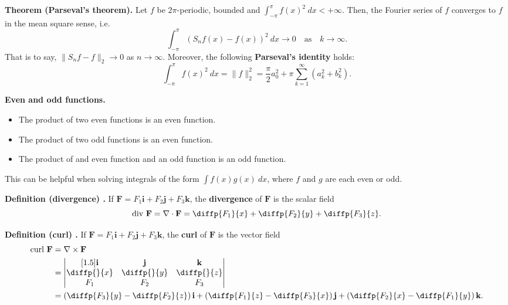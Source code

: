 \begin{shaded}
\textbf{Theorem (Parseval's theorem).} Let $f$ be $2 \pi$-periodic, bounded and $\int_{-\pi}^\pi f(x)^2 \ dx < + \infty$. Then, the Fourier series of $f$ converges to $f$ in the mean square sense, i.e.
$$ \int_{- \pi}^\pi (S_n f(x) - f(x))^2 \ dx \to 0 \quad \text{as} \quad k \to \infty . $$
That is to say, $\lVert S_n f - f \rVert_2 \to 0$ as $n \to \infty$. Moreover, the following \textbf{Parseval's identity} holds:
$$ \int_{-\pi}^\pi f(x)^2 \ dx = \lVert f \rVert_2^2 = \frac{\pi}{2} a_0^2 + \pi \sum_{k = 1}^{\infty} (a_k^2 + b_k^2) . $$
\end{shaded}

\begin{shaded}
\textbf{Even and odd functions.}
\begin{itemize}
	\item The product of two even functions is an even function.
	\item The product of two odd functions is an even function.
	\item The product of and even function and an odd function is an odd function.
\end{itemize}

This can be helpful when solving integrals of the form $\int f(x)g(x) \ dx$, where $f$ and $g$ are each even or odd.
\end{shaded}

\begin{shaded}
\textbf{Definition (divergence) \cite{math2111_notes}.} If $\mathbf{F} = F_1 \mathbf{i} + F_2 \mathbf{j} + F_3 \mathbf{k}$, the \textbf{divergence} of $\mathbf{F}$ is the scalar field
$$ \text{div} \ \mathbf{F} = \nabla \cdot \mathbf{F} = \diffp{F_1}{x} + \diffp{F_2}{y} + \diffp{F_3}{z} . $$
\end{shaded}

\begin{shaded}
\textbf{Definition (curl) \cite{math2111_notes}.} If $\mathbf{F} = F_1 \mathbf{i} + F_2 \mathbf{j} + F_3 \mathbf{k}$, the \textbf{curl} of $\mathbf{F}$ is the vector field
\begin{align*}
\text{curl} \ \mathbf{F} &= \nabla \times \mathbf{F} \\
&= \begin{vmatrix}[1.5]
	\mathbf{i} & \mathbf{j} & \mathbf{k} \\
	\diffp{}{x} & \diffp{}{y} & \diffp{}{z} \\
	F_1 & F_2 & F_3
\end{vmatrix} \\
&= \left( \diffp{F_3}{y} - \diffp{F_2}{z} \right) \mathbf{i} + \left( \diffp{F_1}{z} - \diffp{F_3}{x} \right) \mathbf{j} + \left( \diffp{F_2}{x} - \diffp{F_1}{y} \right) \mathbf{k} .
\end{align*} 
\end{shaded}